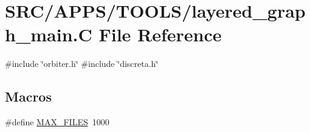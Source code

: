 \hypertarget{layered__graph__main_8_c}{}\section{S\+R\+C/\+A\+P\+P\+S/\+T\+O\+O\+L\+S/layered\+\_\+graph\+\_\+main.C File Reference}
\label{layered__graph__main_8_c}
{\ttfamily \#include \char`\"{}orbiter.\+h\char`\"{}}\newline
{\ttfamily \#include \char`\"{}discreta.\+h\char`\"{}}\newline
\subsection*{Macros}
\begin{DoxyCompactItemize}
\item 
\#define \mbox{\hyperlink{layered__graph__main_8_c_a2c5eecb22513a88c24ae5831a3265e54}{M\+A\+X\+\_\+\+F\+I\+L\+ES}}~1000
\end{DoxyCompactItemize}
